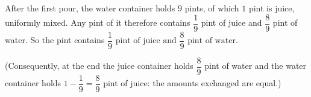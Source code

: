 After the first pour, the water container holds $9$ pints, of which $1$ pint is juice, uniformly mixed. Any pint of it therefore contains $\dfrac19$ pint of juice and $\dfrac89$ pint of water. So the pint contains $\boxed{\dfrac19\text{ pint of juice and }\dfrac89\text{ pint of water}}$.

(Consequently, at the end the juice container holds $\dfrac89$ pint of water and the water container holds $1-\dfrac19=\dfrac89$ pint of juice: the amounts exchanged are equal.)
